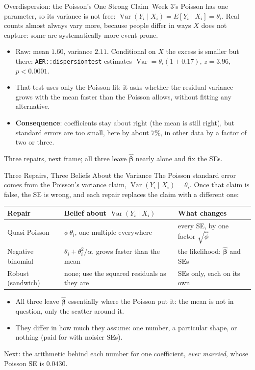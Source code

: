 \documentclass[aspectratio=169,11pt,xcolor=dvipsnames]{beamer}
\DeclareMathOperator{\Var}{Var}
\newcommand{\E}{E}
\newcommand{\core}{\,\raisebox{0.6pt}{\textcolor{corestar}{$\bigstar$}}}
\begin{document}
\begin{frame}{Overdispersion: the Poisson's One Strong Claim\core}
Week 3's Poisson has one parameter, so its variance is not free:
$\Var(Y_i \mid X_i) = \E[Y_i \mid X_i] = \theta_i$. Real counts almost
always vary more, because people differ in ways $X$ does not capture: some
are systematically more event-prone.
\begin{itemize}\itemsep3pt
  \item Raw: mean $1.60$, variance $2.11$. Conditional on $X$ the excess
        is smaller but there: \texttt{AER::dispersiontest} estimates
        $\Var = \theta_i(1 + 0.17)$, $z = 3.96$, $p < 0.0001$.
  \item That test uses only the Poisson fit: it asks whether the residual
        variance grows with the mean faster than the Poisson allows,
        without fitting any alternative.
  \item \textbf{Consequence}: coefficients stay about right (the mean is
        still right), but \alert{standard errors are too small}, here by
        about $7\%$, in other data by a factor of two or three.
\end{itemize}
\vskip3pt
Three repairs, next frame; all three leave $\hat{\bm\beta}$ nearly alone
and fix the SEs.
\end{frame}

\begin{frame}{Three Repairs, Three Beliefs About the Variance}
The Poisson standard error comes from the Poisson's variance claim,
$\Var(Y_i \mid X_i) = \theta_i$. Once that claim is false, the SE is wrong,
and each repair replaces the claim with a different one:
\begin{center}\footnotesize
\renewcommand{\arraystretch}{1.1}
\begin{tabular}{lll}
\toprule
Repair & Belief about $\Var(Y_i \mid X_i)$ & What changes \\
\midrule
Quasi-Poisson & $\phi\,\theta_i$, one multiple everywhere & every SE, by one factor $\sqrt{\hat\phi}$ \\
Negative binomial & $\theta_i + \theta_i^2/\alpha$, grows faster than the mean & the likelihood: $\hat{\bm\beta}$ and SEs \\
Robust (sandwich) & none; use the squared residuals as they are & SEs only, each on its own \\
\bottomrule
\end{tabular}
\end{center}
\vskip2pt
\begin{itemize}\itemsep2pt
  \item All three leave $\hat{\bm\beta}$ essentially where the Poisson
        put it: the mean is not in question, only the scatter around it.
  \item They differ in how much they assume: one number, a particular
        shape, or nothing (paid for with noisier SEs).
\end{itemize}
Next: the arithmetic behind each number for one coefficient, \emph{ever
married}, whose Poisson SE is $0.0430$.
\end{frame}
\end{document}
